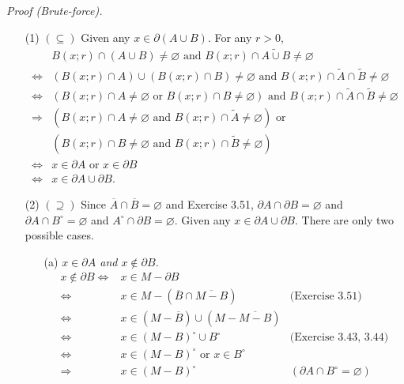 \documentclass{article}
\begin{document}
\emph{Proof (Brute-force).}
\begin{enumerate}
\item[(1)]
$(\subseteq)$
Given any $x \in \partial(A \cup B)$.
For any $r > 0$,
\begin{align*}
&B(x;r) \cap (A \cup B) \neq \varnothing \text{ and }
B(x;r) \cap \widetilde{A \cup B} \neq \varnothing \\
\Longleftrightarrow&
(B(x;r) \cap A) \cup (B(x;r) \cap B) \neq \varnothing \text{ and }
B(x;r) \cap \widetilde{A} \cap \widetilde{B} \neq \varnothing \\
\Longleftrightarrow&
( B(x;r) \cap A \neq \varnothing
  \text{ or } B(x;r) \cap B \neq \varnothing )
\text{ and }
B(x;r) \cap \widetilde{A} \cap \widetilde{B} \neq \varnothing \\
\Longrightarrow&
( B(x;r) \cap A \neq \varnothing
  \text{ and } B(x;r) \cap \widetilde{A} \neq \varnothing)
\text{ or } \\
&( B(x;r) \cap B \neq \varnothing
  \text{ and } B(x;r) \cap \widetilde{B} \neq \varnothing) \\
\Longleftrightarrow&
x \in \partial A \text{ or } x \in \partial B \\
\Longleftrightarrow&
x \in \partial A \cup \partial B.
\end{align*}
\item[(2)]
$(\supseteq)$
Since $\overline{A} \cap \overline{B} = \varnothing$ and Exercise 3.51,
$\partial A \cap \partial B = \varnothing$
and $\partial A \cap B^{\circ} = \varnothing$
and $A^{\circ} \cap \partial B = \varnothing$.
Given any $x \in \partial A \cup \partial B$.
There are only two possible cases.
  \begin{enumerate}
  \item[(a)]
  \emph{$x \in \partial A$ and $x \not\in \partial B$.}
  \begin{align*}
  x \not\in \partial B
  \Longleftrightarrow&
  x \in M - \partial B \\
  \Longleftrightarrow&
  x \in M - ( \overline{B} \cap \overline{M-B})
    &\text{(Exercise 3.51)} \\
  \Longleftrightarrow&
  x \in (M - \overline{B}) \cup (M - \overline{M-B}) \\
  \Longleftrightarrow&
  x \in (M-B)^{\circ} \cup B^{\circ}
    &\text{(Exercise 3.43, 3.44)} \\
  \Longleftrightarrow&
  x \in (M-B)^{\circ} \text{ or } x \in B^{\circ} \\
  \Longrightarrow&
  x \in (M-B)^{\circ}
    &(\partial A \cap B^{\circ} = \varnothing)

\end{align*}
\end{enumerate}
\end{enumerate}
\end{document}

